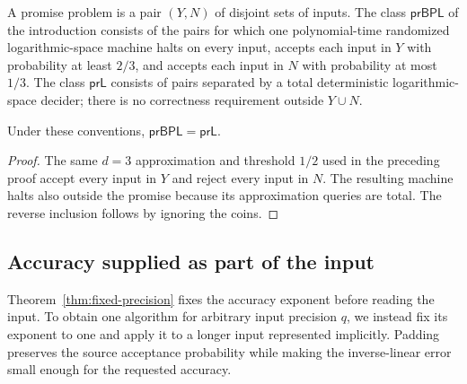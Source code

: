 A promise problem is a pair $(Y,N)$ of disjoint sets of inputs.
The class $\mathsf{prBPL}$ of the introduction consists of the pairs for
which one polynomial-time randomized
logarithmic-space machine halts on every input, accepts each
input in $Y$ with probability at least $2/3$, and accepts each
input in $N$ with probability at most $1/3$.
The class $\mathsf{prL}$ consists of pairs separated by a total
deterministic logarithmic-space decider; there is no correctness
requirement outside $Y\cup N$.

\begin{corollary}\label{cor:promise-bpl}
Under these conventions,
$\mathsf{prBPL}=\mathsf{prL}$.
\end{corollary}

\begin{proof}
The same $d=3$ approximation and threshold $1/2$ used in the preceding
proof accept every input in $Y$ and reject every input in $N$.
The resulting machine halts also outside the promise because its
approximation queries are total. The reverse inclusion follows by
ignoring the coins.
\end{proof}

\subsection{Accuracy supplied as part of the input}

Theorem~\ref{thm:fixed-precision} fixes the accuracy exponent before
reading the input.  To obtain one algorithm for arbitrary input precision
$q$, we instead fix its exponent to one and apply it to a longer input
represented implicitly.  Padding preserves the source acceptance
probability while making the inverse-linear error small enough for the
requested accuracy.

